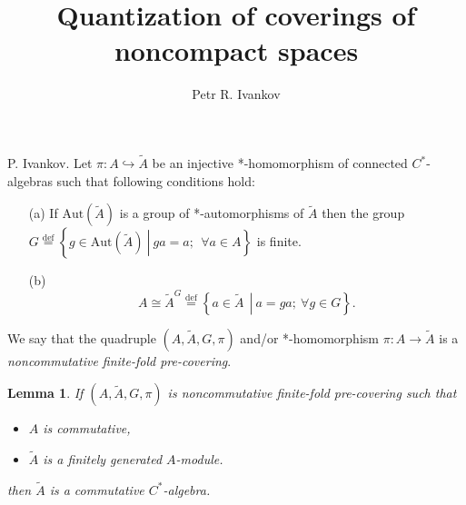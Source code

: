 \documentclass{beamer}
\title{Quantization of coverings of noncompact spaces}
\institute
{
Noncommutative geometry and topology
}
\author{Petr R. Ivankov  }
\theoremstyle{plain}
\newtheorem{lem}{Lemma}%
\newcommand{\be}{\begin{equation}}
\newcommand{\ee}{\end{equation}}
\newcommand{\Aut}{\mathrm{Aut}}
\newcommand{\bydef}{\stackrel{\mathrm{def}}{=}}
\newcommand{\hookto}{\hookrightarrow}        %
\begin{document}
\begin{frame}
  \titlepage
\end{frame}
\begin{frame}
	   \begin{definition}\label{pre_defn} \alert{P. Ivankov}.
		Let $\pi: A \hookto \widetilde{A}$ be an injective *-homomorphism of connected  $C^*$-algebras such that following conditions hold:
		\begin{enumerate}
			\item[(a)] If $\Aut\left(\widetilde{A} \right)$ is a group of *-automorphisms of $\widetilde{A}$ then the group  
			$
			G \bydef \left\{ \left.g \in \Aut\left(\widetilde{A} \right)~\right|~ ga = a;~~\forall a \in A\right\}
			$
			is finite.
			\item[(b)] 	\be\label{cond_b_eqn}
			A \cong \widetilde{A}^G\stackrel{\text{def}}{=}\left\{\left.a\in \widetilde{A}~~\right|~ a = g a;~ \forall g \in G\right\}.\ee
		\end{enumerate}
		We say that the quadruple $\left(A, \widetilde{A}, G, \pi \right)$ and/or *-homomorphism $\pi: A \to \widetilde{A}$   is a \textit{noncommutative finite-fold  pre-covering}. 
	\end{definition}
\begin{lem}
If $\left(A, \widetilde{A}, G, \pi \right)$ is noncommutative finite-fold  pre-covering such that
\begin{itemize}
	\item $A$ is commutative,
	\item $\widetilde{A}$ is a finitely generated $A$-module.
\end{itemize}
then $\widetilde{A}$ is a commutative $C^*$-algebra.
\end{lem}
\end{frame}
\end{document}
